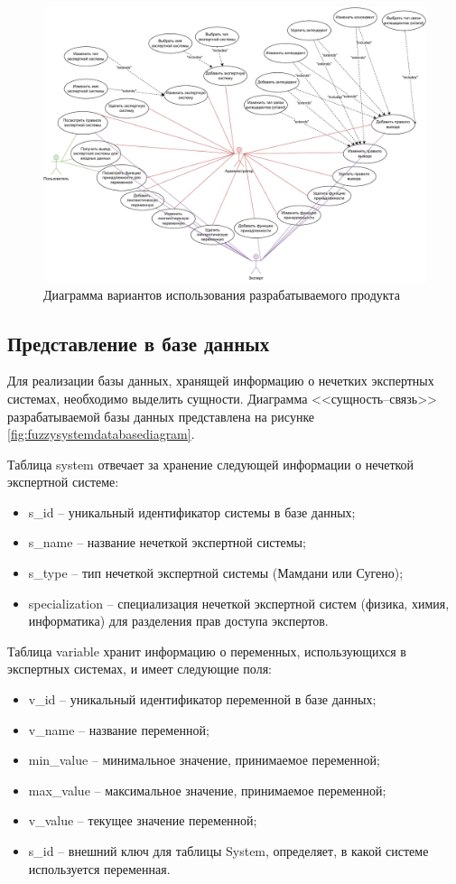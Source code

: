 \begin{figure}[H]
	\centering
	\includegraphics[width=1\linewidth]{img/use-case}
	\caption{Диаграмма вариантов использования разрабатываемого продукта}
	\label{fig:use-case}
\end{figure}

\subsection{Представление в базе данных}
Для реализации базы данных, хранящей информацию о нечетких экспертных системах, необходимо выделить сущности. Диаграмма <<сущность--связь>> разрабатываемой базы данных представлена на рисунке \ref{fig:fuzzysystemdatabasediagram}.

Таблица system отвечает за хранение следующей информации о нечеткой экспертной системе:
\begin{itemize}
	\item s\_id -- уникальный идентификатор системы в базе данных;
	\item s\_name -- название нечеткой экспертной системы;
	\item s\_type -- тип нечеткой экспертной системы (Мамдани или Сугено);
	\item specialization -- специализация нечеткой экспертной систем (физика, химия, информатика) для разделения прав доступа экспертов.
\end{itemize}

Таблица variable хранит информацию о переменных, использующихся в экспертных системах, и имеет следующие поля:
\begin{itemize}
	\item v\_id -- уникальный идентификатор переменной в базе данных;
	\item v\_name -- название переменной;
	\item min\_value -- минимальное значение, принимаемое переменной;
	\item max\_value -- максимальное значение, принимаемое переменной;
	\item v\_value -- текущее значение переменной;
	\item s\_id -- внешний ключ для таблицы System, определяет, в какой системе используется переменная.
\end{itemize}

